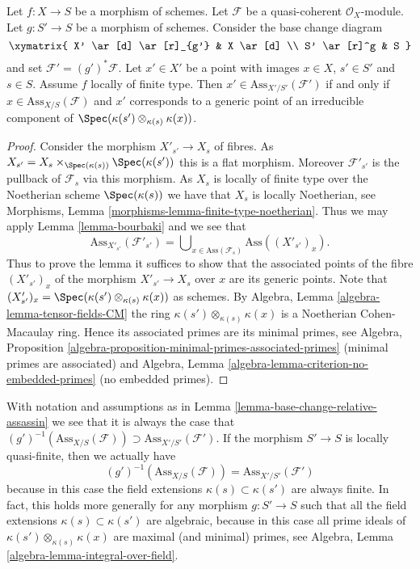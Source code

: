 \begin{lemma}
\label{lemma-base-change-relative-assassin}
Let $f : X \to S$ be a morphism of schemes.
Let $\mathcal{F}$ be a quasi-coherent $\mathcal{O}_X$-module.
Let $g : S' \to S$ be a morphism of schemes.
Consider the base change diagram
$$
\xymatrix{
X' \ar[d] \ar[r]_{g'} & X \ar[d] \\
S' \ar[r]^g & S
}
$$
and set $\mathcal{F}' = (g')^*\mathcal{F}$. Let $x' \in X'$ be a point
with images $x \in X$, $s' \in S'$ and $s \in S$.
Assume $f$ locally of finite type.
Then $x' \in \text{Ass}_{X'/S'}(\mathcal{F}')$ if and only if
$x \in \text{Ass}_{X/S}(\mathcal{F})$ and $x'$ corresponds to
a generic point of an irreducible component of
$\Spec(\kappa(s') \otimes_{\kappa(s)} \kappa(x))$.
\end{lemma}

\begin{proof}
Consider the morphism $X'_{s'} \to X_s$ of fibres. As
$X_{s'} = X_s \times_{\Spec(\kappa(s))} \Spec(\kappa(s'))$
this is a flat morphism. Moreover $\mathcal{F}'_{s'}$ is the pullback
of $\mathcal{F}_s$ via this morphism. As $X_s$ is locally of finite
type over the Noetherian scheme $\Spec(\kappa(s))$ we have that
$X_s$ is locally Noetherian, see
Morphisms, Lemma \ref{morphisms-lemma-finite-type-noetherian}.
Thus we may apply
Lemma \ref{lemma-bourbaki}
and we see that
$$
\text{Ass}_{X'_{s'}}(\mathcal{F}'_{s'}) =
\bigcup\nolimits_{x \in \text{Ass}(\mathcal{F}_s)} \text{Ass}((X'_{s'})_x).
$$
Thus to prove the lemma it suffices to show that the associated points
of the fibre $(X'_{s'})_x$ of the morphism $X'_{s'} \to X_s$ over $x$
are its generic points. Note that
$(X'_{s'})_x = \Spec(\kappa(s') \otimes_{\kappa(s)} \kappa(x))$
as schemes. By
Algebra, Lemma \ref{algebra-lemma-tensor-fields-CM}
the ring $\kappa(s') \otimes_{\kappa(s)} \kappa(x)$ is a Noetherian
Cohen-Macaulay ring. Hence its associated primes are its minimal primes, see
Algebra, Proposition \ref{algebra-proposition-minimal-primes-associated-primes}
(minimal primes are associated) and
Algebra, Lemma \ref{algebra-lemma-criterion-no-embedded-primes}
(no embedded primes).
\end{proof}

\begin{remark}
\label{remark-base-change-relative-assassin}
With notation and assumptions as in
Lemma \ref{lemma-base-change-relative-assassin}
we see that it is always the case that
$(g')^{-1}(\text{Ass}_{X/S}(\mathcal{F})) \supset
\text{Ass}_{X'/S'}(\mathcal{F}')$.
If the morphism $S' \to S$ is locally quasi-finite, then we actually have
$$
(g')^{-1}(\text{Ass}_{X/S}(\mathcal{F}))
=
\text{Ass}_{X'/S'}(\mathcal{F}')
$$
because in this case the field extensions $\kappa(s) \subset \kappa(s')$
are always finite. In fact, this holds more generally for any morphism
$g : S' \to S$ such that all the field extensions
$\kappa(s) \subset \kappa(s')$ are algebraic, because in this case all
prime ideals of $\kappa(s') \otimes_{\kappa(s)} \kappa(x)$ are
maximal (and minimal) primes, see
Algebra, Lemma \ref{algebra-lemma-integral-over-field}.
\end{remark}




